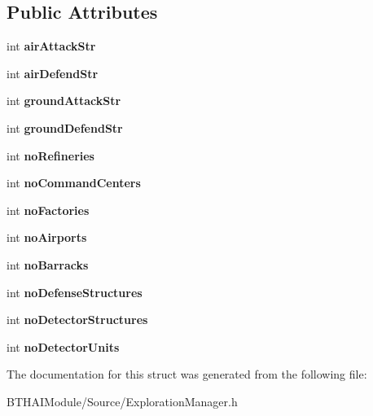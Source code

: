 \subsection*{Public Attributes}
\begin{DoxyCompactItemize}
\item 
\hypertarget{struct_force_data_ae8fe49859d5b7db50b0c912ceb10d5ae}{int {\bfseries air\-Attack\-Str}}\label{struct_force_data_ae8fe49859d5b7db50b0c912ceb10d5ae}

\item 
\hypertarget{struct_force_data_a5e122388fb5c92d87608a13ce1bfa0cf}{int {\bfseries air\-Defend\-Str}}\label{struct_force_data_a5e122388fb5c92d87608a13ce1bfa0cf}

\item 
\hypertarget{struct_force_data_ae12bdef0e5f3251f894941b15a9e469f}{int {\bfseries ground\-Attack\-Str}}\label{struct_force_data_ae12bdef0e5f3251f894941b15a9e469f}

\item 
\hypertarget{struct_force_data_a4793f1eda805771e87af957b89769c34}{int {\bfseries ground\-Defend\-Str}}\label{struct_force_data_a4793f1eda805771e87af957b89769c34}

\item 
\hypertarget{struct_force_data_a44da2c17223132164a48c66f48043efb}{int {\bfseries no\-Refineries}}\label{struct_force_data_a44da2c17223132164a48c66f48043efb}

\item 
\hypertarget{struct_force_data_aa94d60dfa511fb955beef4b65c4d9f76}{int {\bfseries no\-Command\-Centers}}\label{struct_force_data_aa94d60dfa511fb955beef4b65c4d9f76}

\item 
\hypertarget{struct_force_data_a562af56fa6956c783d27c560d543cb20}{int {\bfseries no\-Factories}}\label{struct_force_data_a562af56fa6956c783d27c560d543cb20}

\item 
\hypertarget{struct_force_data_a7b85259f904cb24f76e66b2121d9acd3}{int {\bfseries no\-Airports}}\label{struct_force_data_a7b85259f904cb24f76e66b2121d9acd3}

\item 
\hypertarget{struct_force_data_abc9cf1af28445d594cbca54d2b65505b}{int {\bfseries no\-Barracks}}\label{struct_force_data_abc9cf1af28445d594cbca54d2b65505b}

\item 
\hypertarget{struct_force_data_a6d7c0cfd0179b114c9986a1a5c2033b5}{int {\bfseries no\-Defense\-Structures}}\label{struct_force_data_a6d7c0cfd0179b114c9986a1a5c2033b5}

\item 
\hypertarget{struct_force_data_a09a5d3b74bef1c233226be532764cd6a}{int {\bfseries no\-Detector\-Structures}}\label{struct_force_data_a09a5d3b74bef1c233226be532764cd6a}

\item 
\hypertarget{struct_force_data_a3a6b2d662599b36752559930997d9585}{int {\bfseries no\-Detector\-Units}}\label{struct_force_data_a3a6b2d662599b36752559930997d9585}

\end{DoxyCompactItemize}


The documentation for this struct was generated from the following file\-:\begin{DoxyCompactItemize}
\item 
B\-T\-H\-A\-I\-Module/\-Source/Exploration\-Manager.\-h\end{DoxyCompactItemize}
